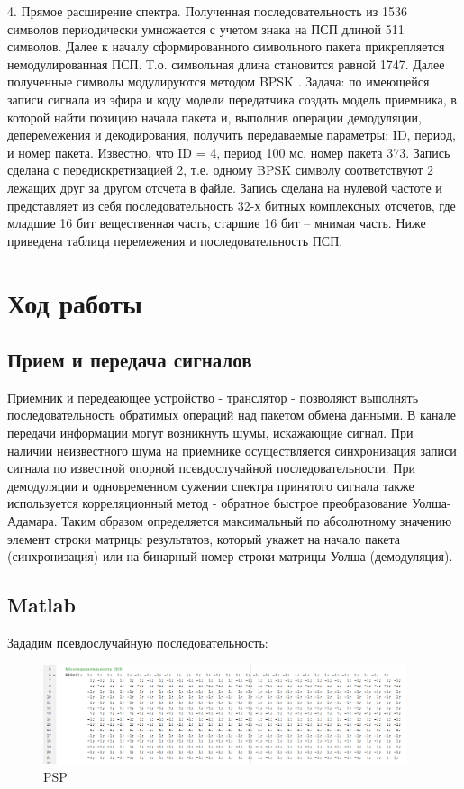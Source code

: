 \documentclass[a4paper,14pt]{extarticle}
\begin{document}
4. Прямое расширение спектра. Полученная последовательность из 1536 символов периодически умножается с учетом знака на ПСП длиной 511 символов. Далее к началу сформированного символьного пакета прикрепляется немодулированная ПСП. Т.о. символьная длина становится равной 1747. Далее полученные символы модулируются методом BPSK . Задача: по имеющейся записи сигнала из эфира и коду модели передатчика создать модель приемника, в которой найти позицию начала пакета и, выполнив операции демодуляции, деперемежения и декодирования, получить передаваемые параметры: ID, период, и номер пакета. Известно, что ID = 4, период 100 мс, номер пакета 373. Запись сделана с передискретизацией 2, т.е. одному BPSK символу соответствуют 2 лежащих друг за другом отсчета в файле. Запись сделана на нулевой частоте и представляет из себя последовательность 32-х битных комплексных отсчетов, где младшие 16 бит вещественная часть, старшие 16 бит – мнимая часть. Ниже приведена таблица перемежения и последовательность ПСП.

\section{Ход работы}

\subsection{Прием и передача сигналов}
Приемник и передеающее устройство - транслятор - позволяют выполнять последовательность обратимых операций над пакетом обмена данными. В канале передачи информации могут возникнуть шумы, искажающие сигнал. При наличии неизвестного шума на приемнике осуществляется синхронизация записи сигнала по известной опорной псевдослучайной последовательности.
При демодуляции и одновременном сужении спектра принятого сигнала также используется корреляционный метод - обратное быстрое преобразование Уолша-Адамара. 
Таким образом определяется максимальный по абсолютному значению элемент строки матрицы результатов, который укажет на начало пакета (синхронизация) или на бинарный номер строки матрицы Уолша (демодуляция).

\subsection{Matlab}

Зададим псевдослучайную последовательность:

\begin{figure}[H]
\centering
\includegraphics[width=0.95\textwidth]{psp}
\captionsetup{justification=centering,margin=1.0 cm}
\caption{PSP}
\label{any}
\end{figure}
\end{document}
